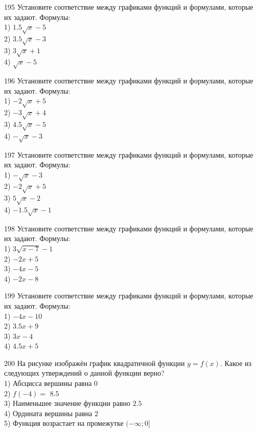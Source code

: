 \documentclass[4apaper]{article}
\begin{document}
\begin{taskBN}{195}
Установите соответствие между графиками функций и формулами, которые их задают. Формулы: \\1) $1.5\sqrt{x}-5$\\2) $3.5\sqrt{x}-3$\\3) $3\sqrt{x}+1$\\4) $\sqrt{x}-5$
\end{taskBN}

\begin{taskBN}{196}
Установите соответствие между графиками функций и формулами, которые их задают. Формулы: \\1) $-2\sqrt{x}+5$\\2) $-3\sqrt{x}+4$\\3) $4.5\sqrt{x}-5$\\4) $-\sqrt{x}-3$
\end{taskBN}

\begin{taskBN}{197}
Установите соответствие между графиками функций и формулами, которые их задают. Формулы: \\1) $-\sqrt{x}-3$\\2) $-2\sqrt{x}+5$\\3) $5\sqrt{x}-2$\\4) $-1.5\sqrt{x}-1$
\end{taskBN}

\begin{taskBN}{198}
Установите соответствие между графиками функций и формулами, которые их задают. Формулы: \\1) $3\sqrt{x-7}-1$\\2) $-2x+5$\\3) $-4x-5$\\4) $-2x-8$
\end{taskBN}

\begin{taskBN}{199}
Установите соответствие между графиками функций и формулами, которые их задают. Формулы: \\1) $-4x-10$\\2) $3.5x+9$\\3) $3x-4$\\4) $4.5x+5$
\end{taskBN}

\begin{taskBN}{200}
На рисунке изображён график квадратичной функции $y=f(x)$. Какое из следующих утверждений о данной функции верно?\\1) Абсцисса вершины равна $0$\\2) $f(-4)=$ $8.5$\\3) Наименьшее значение функции равно  $2.5$\\4) Ордината вершины равна $2$\\5) Функция возрастает на промежутке $(-\infty;0]$
\end{taskBN}
\end{document}

